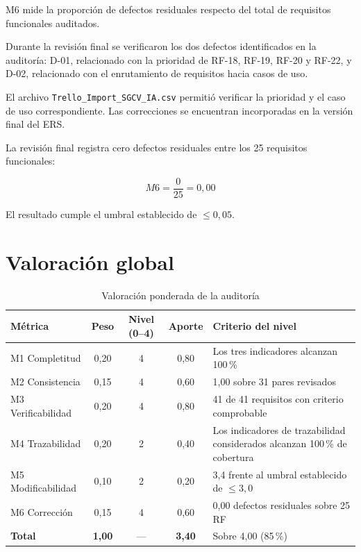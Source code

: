M6 mide la proporción de defectos residuales respecto del total de requisitos
funcionales auditados.

Durante la revisión final se verificaron los dos defectos identificados en la
auditoría: D-01, relacionado con la prioridad de RF-18, RF-19, RF-20 y RF-22,
y D-02, relacionado con el enrutamiento de requisitos hacia casos de uso.

El archivo \texttt{Trello\_Import\_SGCV\_IA.csv} permitió verificar la
prioridad y el caso de uso correspondiente. Las correcciones se encuentran
incorporadas en la versión final del ERS.

La revisión final registra cero defectos residuales entre los 25 requisitos
funcionales:

\[
M6=\frac{0}{25}=0{,}00
\]

El resultado cumple el umbral establecido de $\leq 0{,}05$.

\section{Valoración global}

\begin{table}[h]
\centering
\footnotesize
\caption{Valoración ponderada de la auditoría}
\label{tab:valoracion}
\begin{tabular}{|p{4.2cm}|c|c|c|p{5.0cm}|}
\hline
\textbf{Métrica} &
\textbf{Peso} &
\textbf{Nivel (0--4)} &
\textbf{Aporte} &
\textbf{Criterio del nivel} \\ \hline

M1 Completitud &
0,20 &
4 &
0,80 &
Los tres indicadores alcanzan 100\,\% \\ \hline

M2 Consistencia &
0,15 &
4 &
0,60 &
1,00 sobre 31 pares revisados \\ \hline

M3 Verificabilidad &
0,20 &
4 &
0,80 &
41 de 41 requisitos con criterio comprobable \\ \hline

M4 Trazabilidad &
0,20 &
2 &
0,40 &
Los indicadores de trazabilidad considerados alcanzan 100\,\% de cobertura \\ \hline

M5 Modificabilidad &
0,10 &
2 &
0,20 &
3,4 frente al umbral establecido de $\leq 3{,}0$ \\ \hline

M6 Corrección &
0,15 &
4 &
0,60 &
0,00 defectos residuales sobre 25 RF \\ \hline

\textbf{Total} &
\textbf{1,00} &
--- &
\textbf{3,40} &
Sobre 4,00 (85\,\%) \\ \hline

\end{tabular}
\end{table}

